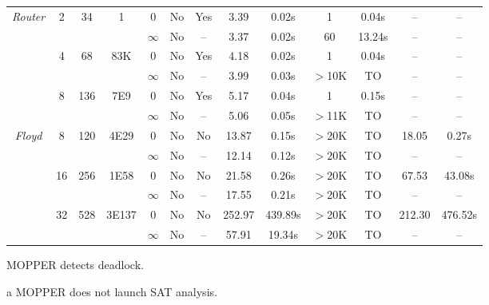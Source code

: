 \begin{savenotes}
\begin{table*}[t]
\begin{center}
\begin{threeparttable}
\begin{tabular}{|c|c|c|c|c|c|c|c|c|c|c|c|c|}
            \multirow{6}{*}{\textit{Router}} & \multirow{2}{*}{2} & \multirow{2}{*}{34} &  \multirow{2}{*}{1} 
          												     & 0 & No & Yes & 3.39 & 0.02s & 1 & 0.04s & -- & -- \tnote{a}\\ \cline{5-13}
          						       &                            & &  &  $\infty$ & No & -- & 3.37 & 0.02s & 60 & 13.24s &  -- & --\\ \cline{2-13}
						       		& \multirow{2}{*}{4} & \multirow{2}{*}{68} &  \multirow{2}{*}{83K} 
          												     & 0 & No & Yes & 4.18 & 0.02s & 1 & 0.04s & -- & --\tnote{a}\\ \cline{5-13}
          						       &                            & &  &  $\infty$ & No & -- & 3.99 & 0.03s & $>$10K & TO &  -- & --\\ \cline{2-13}
						              & \multirow{2}{*}{8} & \multirow{2}{*}{136} &  \multirow{2}{*}{7E9} 
          												     & 0 & No & Yes & 5.17 & 0.04s & 1 & 0.15s & -- & --\tnote{a}\\ \cline{5-13}
          						       &                            & &  &  $\infty$ & No & -- & 5.06 & 0.05s & $>$11K & TO & --  & --\\ \hline
						       \hline
						       
	    \multirow{6}{*}{\textit{Floyd}} & \multirow{2}{*}{8} & \multirow{2}{*}{120} &  \multirow{2}{*}{4E29} 
          												     & 0 & No & No & 13.87 & 0.15s & $>$20K & TO & 18.05 & 0.27s\\ \cline{5-13}
          						       &                            & &  &  $\infty$ & No & -- & 12.14 & 0.12s & $>$20K & TO &  -- & --\\ \cline{2-13}
						       		& \multirow{2}{*}{16} & \multirow{2}{*}{256} &  \multirow{2}{*}{1E58} 
          												     & 0 & No & No & 21.58 & 0.26s & $>$20K & TO & 67.53 & 43.08s\\ \cline{5-13}
          						       &                            & &  &  $\infty$ & No & -- & 17.55 & 0.21s & $>$20K & TO &  -- & --\\ \cline{2-13}
						              & \multirow{2}{*}{32} & \multirow{2}{*}{528} &  \multirow{2}{*}{3E137} 
          												     & 0 & No & No & 252.97 & 439.89s & $>$20K & TO & 212.30 & 476.52s\\ \cline{5-13}
          						       &                            & &  &  $\infty$ & No & -- & 57.91 & 19.34s & $>$20K & TO & --  & --\\ \hline
         
\end{tabular}
\begin{tablenotes}
\item[\textdagger] MOPPER detects deadlock. 
\item[a] MOPPER does not launch SAT analysis.
\end{tablenotes}
     \end{threeparttable}
\end{center}
\end{table*}
\end{savenotes}


